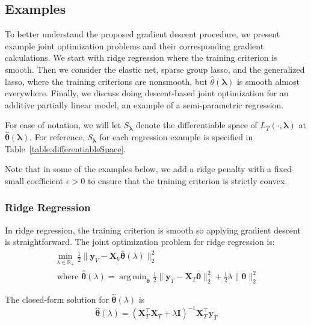 \documentclass[10pt,letterpaper]{article}
\DeclareMathOperator*{\argmin}{arg\,min}
\begin{document}
\subsection{Examples}\label{exampleSection}

To better understand the proposed gradient descent procedure, we present example joint optimization problems and their corresponding gradient calculations. We start with ridge regression where the training criterion is smooth. Then we consider the elastic net, sparse group lasso, and the generalized lasso, where the training criterions are nonsmooth, but $\hat{\theta}(\boldsymbol\lambda)$ is smooth almost everywhere. Finally, we discuss doing descent-based joint optimization for an additive partially linear model, an example of a semi-parametric regression.

For ease of notation, we will let $S_{\boldsymbol{\lambda}}$ denote the differentiable space of $L_T(\cdot, \boldsymbol{\lambda})$ at $\hat{\boldsymbol{\theta}}(\boldsymbol{\lambda})$. For reference, $S_{\boldsymbol{\lambda}}$ for each regression example is specified in Table~\ref{table:differentiableSpace}. 

Note that in some of the examples below, we add a ridge penalty with a fixed small coefficient $\epsilon > 0$ to ensure that the training criterion is strictly convex.

\subsubsection{Ridge Regression}

In ridge regression, the training criterion is smooth so applying gradient descent is straightforward. The joint optimization problem for ridge regression is:
\begin{equation}
\begin{array}{c}
\min_{\lambda\in \mathbb{R}_{+}} \frac{1}{2} \| \boldsymbol{y}_V - \boldsymbol{X}_V \hat{\boldsymbol{\theta}} (\lambda) \|_2 ^2 \\
\text{  where  } \hat{\boldsymbol{\theta}} (\lambda) = \argmin_{\boldsymbol{\theta}} \frac{1}{2} \| \boldsymbol{y}_T - \boldsymbol{X}_T \boldsymbol{\theta} \|_2 ^2 + \frac{1}{2} \lambda \| \boldsymbol{\theta} \|_2^2
\end{array}
\end{equation}

The closed-form solution for $\hat{\boldsymbol{\theta}}(\lambda)$ is
\begin{equation}
\hat{\boldsymbol{\theta}} (\lambda) = (\boldsymbol{X}_T^\top\boldsymbol{X}_T + \lambda \boldsymbol{I})^{-1}\boldsymbol{X}_T^\top\boldsymbol{y}_T
\end{equation}
\end{document}
